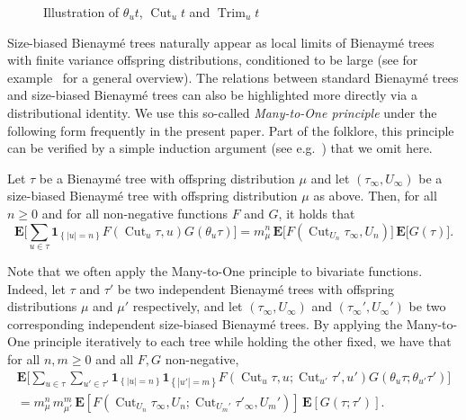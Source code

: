 \documentclass[11pt,reqno]{amsart}
\newcommand{\1}{\mathbf{1}}
\newcommand{\0}{\mathbf{0}}
\newcommand{\E}{{\mathbf E}}
\newcommand{\I}[1]{{\mathbf 1}_{\left\{#1\right\}}}
\newcommand{\Cut}{\operatorname{Cut}}
\newcommand{\Trim}{\operatorname{Trim}}
\begin{document}
\begin{figure}
\begin{tikzpicture}[x=0.75pt,y=0.75pt,yscale=1,xscale=1]
\end{tikzpicture}


    \caption{Illustration of $\theta_u t$, $\Cut_u t$ and $\Trim_u t$}
    \label{fig:basic-defs}
\end{figure}

Size-biased Bienaymé trees naturally appear as local limits of Bienaymé trees with finite variance offspring distributions, conditioned to be large (see for example~\cite{abraham2015introduction} for a general overview). The relations between standard Bienaymé trees and size-biased Bienaymé trees can also be highlighted more directly via a distributional identity. We use this so-called \emph{Many-to-One principle} under the following form frequently in the present paper. Part of the folklore, this principle can be verified by a simple induction argument (see e.g.~\cite[Equation (24)]{duquesne09}) that we omit here.



\begin{prop}
\label{many-to-one}
Let $\tau$ be a Bienaymé tree with offspring distribution $\mu$ and let $(\tau_\infty,U_\infty)$ be a size-biased Bienaymé tree with offspring distribution $\mu$ as above. Then, for all $n\geq 0$ and for all non-negative functions $F$ and $G$, it holds that
 \[\E\bigg[\sum_{u\in \tau}\I{|u|=n}F(\Cut_u \tau,u)G(\theta_u\tau)\bigg]=m_\mu^n\, \E\big[F(\Cut_{U_n} \tau_\infty,U_n)\big]\, \E\big[G(\tau)\big].\]
\end{prop}

Note that we often apply the Many-to-One principle to bivariate functions. Indeed, let $\tau$ and $\tau'$ be two independent Bienaymé trees with offspring distributions $\mu$ and $\mu'$ respectively, and let $(\tau_\infty, U_\infty)$ and $(\tau_\infty', U_\infty')$ be two corresponding independent size-biased Bienaymé trees. By applying the Many-to-One principle iteratively to each tree while holding the other fixed, we have that for all $n, m \geq 0$ and all $F,G$ non-negative,
\begin{multline*}
    \E\Big[\sum_{u\in \tau}\sum_{u'\in \tau'}\I{|u|=n}\I{|u'|=m} F(\Cut_u \tau, u ; \Cut_{u'} \tau', u') G(\theta_u\tau ; \theta_{u'}\tau')\Big] \\ 
    = m_\mu^n\, m_{\mu'}^m\, \E\left[F(\Cut_{U_n} \tau_\infty, U_n ; \Cut_{U_m'} \tau'_\infty, U_m')\right]\, \E\left[G(\tau ; \tau')\right].
\end{multline*}
\end{document}
